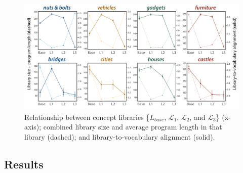 \documentclass[10pt,letterpaper]{article}
\begin{document}


\begin{figure}[ht!]
  \begin{center}
  \includegraphics[width=0.99\linewidth]{figures/lax_library_costs.pdf}
  \caption{Relationship between concept libraries \{$L_{base}$, $\mathcal{L}_1$, $\mathcal{L}_2$, and $\mathcal{L}_3$\} (x-axis); combined library size and average program length in that library (dashed); and library-to-vocabulary alignment (solid).}\label{fig:perplexity-length}
  \end{center}
\end{figure}

\subsection{Results}
\end{document}
